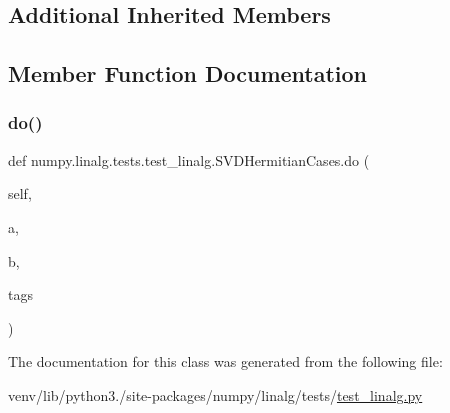 \subsection*{Additional Inherited Members}


\subsection{Member Function Documentation}
\mbox{\label{classnumpy_1_1linalg_1_1tests_1_1test__linalg_1_1SVDHermitianCases_aaad1bb53bbb0f6757a1d983eed8aa477}} 
\subsubsection{\texorpdfstring{do()}{do()}}
{\footnotesize\ttfamily def numpy.\+linalg.\+tests.\+test\+\_\+linalg.\+S\+V\+D\+Hermitian\+Cases.\+do (\begin{DoxyParamCaption}\item[{}]{self,  }\item[{}]{a,  }\item[{}]{b,  }\item[{}]{tags }\end{DoxyParamCaption})}



The documentation for this class was generated from the following file\+:\begin{DoxyCompactItemize}
\item 
venv/lib/python3./site-\/packages/numpy/linalg/tests/\hyperlink{test__linalg_8py}{test\+\_\+linalg.\+py}\end{DoxyCompactItemize}
